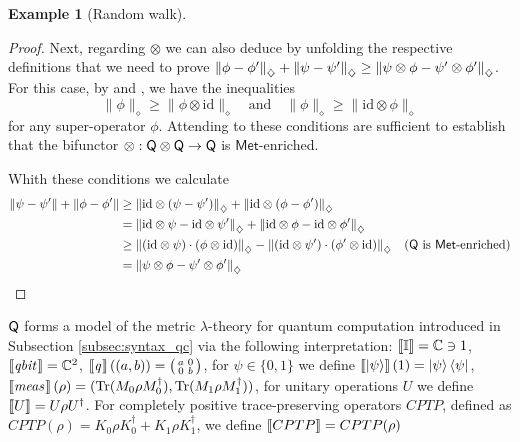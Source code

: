 \documentclass[10pt,a4paper]{amsart}
\theoremstyle{definition}
\theoremstyle{definition}
\newtheorem{example}[definition]{Example}
\theoremstyle{definition}
\theoremstyle{definition}
\theoremstyle{definition}
\theoremstyle{definition}
\begin{document}
\begin{example}[Random walk]
\begin{proof}
  Next, regarding $\otimes$ we can also deduce by unfolding the respective definitions that we need to prove $ \left\lVert \phi - \phi' \right\rVert_{\diamondsuit} + \left\lVert \psi - \psi' \right\rVert_{\diamondsuit} \geq \left\lVert \psi \otimes \phi - \psi' \otimes \phi' \right\rVert_{\diamondsuit}$. 
  For this case,  by \cite[Corollary 3.47]{watrous2018theory} and \cite[Proposition 3.44]{watrous2018theory} , we have the inequalities  
  \[
  \| \phi \|_\diamond \geq \| \phi \otimes \mathrm{id} \|_\diamond
  \quad \text{and} \quad  
  \| \phi \|_\diamond \geq \| \mathrm{id} \otimes \phi \|_\diamond
  \]  
  for any super-operator \( \phi \). Attending to \cite[ Proof of proposition 4.1]{dahlqvist2023syntactic} these conditions are sufficient to establish that the bifunctor $\otimes : \mathsf{Q} \otimes \mathsf{Q} \to \mathsf{Q}$ is $\mathsf{Met}$-enriched.


   Whith these conditions we calculate
  \begin{align*}
      \|\psi - \psi'\| + \|\phi - \phi'\| 
      &\geq \left\lVert \mathrm{id} \otimes \left(\psi-\psi'\right) \right\rVert_{\diamondsuit} + \left\lVert \mathrm{id} \otimes \left(\phi-\phi'\right) \right\rVert_{\diamondsuit}  \\
      &=  \left\lVert \mathrm{id} \otimes \psi- \mathrm{id} \otimes\psi' \right\rVert_{\diamondsuit} + \left\lVert \mathrm{id} \otimes \phi- \mathrm{id} \otimes\phi' \right\rVert_{\diamondsuit} \\
      &\geq \left\lVert \left( \mathrm{id} \otimes \psi \right) \cdot \left( \phi \otimes \mathrm{id} \right) \right\rVert_{\diamondsuit} -  \left\lVert \left( \mathrm{id} \otimes \psi' \right) \cdot \left( \phi' \otimes \mathrm{id} \right) \right\rVert_{\diamondsuit} & (\mathsf{Q} \text{ is } \mathsf{Met}\text{-enriched}) \\
      &= \left\lVert \psi \otimes \phi - \psi' \otimes \phi' \right\rVert_{\diamondsuit}
  \end{align*}

\end{proof}

$\mathsf{Q}$ forms a model of the metric $\lambda$-theory for quantum computation introduced in  Subsection \ref{subsec:syntax_qc} via the following interpretation: $\left \llbracket \mathbb{I} \right \rrbracket= \mathbb{C} \ni  1$, 
$\left \llbracket \emph{qbit} \hspace{1pt} \right \rrbracket= \mathbb{C}^2$, 
$\left \llbracket \emph{q} \hspace{1pt} \right \rrbracket((a,b)) = \big(\begin{smallmatrix}
  a & 0\\
  0 & b
\end{smallmatrix}\big)$, 
for $\psi \in \{0, 1\}$ we define $\left \llbracket \ket{\psi} \right \rrbracket (1)= \ket{\psi} \bra{\psi}$,
$\left \llbracket \emph{meas} \hspace{1pt} \right \rrbracket (\rho)= (\text{Tr} (M_{0} \rho M_{0}^{\dag}), \text{Tr} (M_{1} \rho M_{1}^{\dag}))$, 
for unitary operations $U$ we define $\left \llbracket U \right \rrbracket= U \rho U^{\dag}$. 
For completely positive trace-preserving operators $CPTP$, defined as $CPTP (\rho) = K_0 \rho K_0^{\dag} +  K_1 \rho K_1^{\dag}$, we define  $\left \llbracket CPTP \right \rrbracket= CPTP (\rho)$ 


\end{example}
\end{document}
